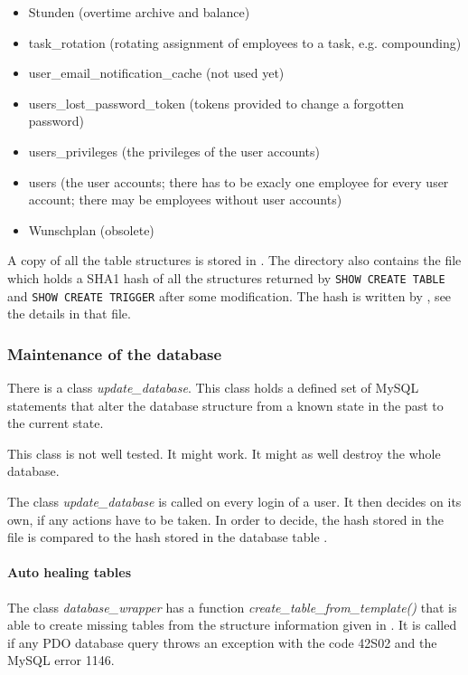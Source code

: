 \begin{itemize}
\item Stunden (overtime archive and balance)
\item task\_rotation (rotating assignment of employees to a task, e.g. compounding)
\item user\_email\_notification\_cache (not used yet)
\item users\_lost\_password\_token (tokens provided to change a forgotten password)
\item users\_privileges (the privileges of the user accounts)
\item users (the user accounts; there has to be exacly one employee for every user account; there may be employees without user accounts)
\item Wunschplan (obsolete)
\end{itemize}


A copy of all the table structures is stored in .
The directory also contains the file  which holds a SHA1 hash of all 
the structures returned by \lstinline|SHOW CREATE TABLE| and \lstinline|SHOW CREATE TRIGGER| after some modification. 
The hash is written by , see the details in that file.

\subsubsection{Maintenance of the database}
There is a class \emph{update\_database}.
This class holds a defined set of MySQL statements that alter the database structure from a known state in the past to the current state.

This class is not well tested. It might work. It might as well destroy the whole database.

The class \emph{update\_database} is called on every login of a user. It then decides on its own, if any actions have to be taken.
In order to decide, the hash stored in the file  is compared to the hash stored in the database table .

\paragraph{Auto healing tables}
The class \emph{database\_wrapper} has a function \emph{create\_table\_from\_template()} that is able to create missing tables from the structure information given in . It is called if any PDO database query throws an exception with the code 42S02 and the MySQL error 1146.

